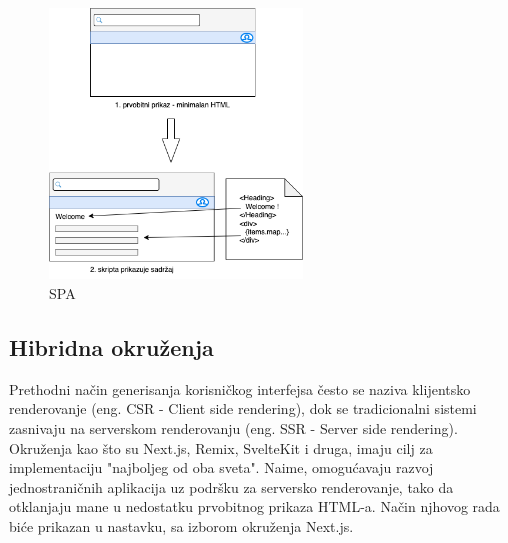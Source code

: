 \documentclass[12pt,oneside]{memoir}
\begin{document}
\begin{figure}[h]
  \centering
  \includegraphics[width=0.6\textwidth]{docs/images/ch_4/frontend-dev-phase2.png} 
  \caption{SPA}
  \label{fig:sample}
\end{figure}

\newpage
\subsection{Hibridna okruženja}

Prethodni način generisanja korisničkog interfejsa često se naziva klijentsko renderovanje (eng. CSR - Client side rendering), dok se tradicionalni sistemi zasnivaju na serverskom renderovanju (eng. SSR - Server side rendering). Okruženja kao što su Next.js\cite{nextjsdocs}, Remix\cite{remixdocs}, SvelteKit\cite{sveltekitdocs} i druga, imaju cilj za implementaciju "najboljeg od oba sveta". Naime, omogućavaju razvoj jednostraničnih aplikacija uz podršku za serversko renderovanje, tako da otklanjaju mane u nedostatku prvobitnog prikaza HTML-a. Način njhovog rada biće prikazan u nastavku, sa izborom okruženja Next.js.

\newpage
\end{document}
